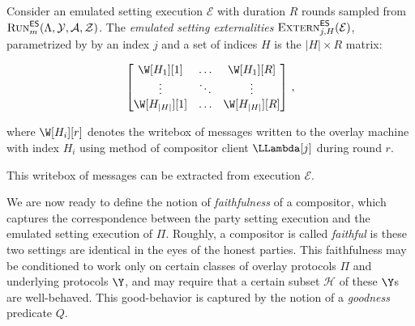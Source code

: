 \begin{definition}
  Consider an emulated setting execution $\mathcal{E}$ with duration $R$ rounds
  sampled from $\textsc{Run}^{\textsf{ES}}_m(\Lambda, \mathcal{Y}, \mathcal{A}, \mathcal{Z})$.
  The \emph{emulated setting externalities} $\textsc{Extern}^{\textsf{ES}}_{j,H}(\mathcal{E})$, parametrized by
  by an index $j$ and a set of indices $H$ is the $|H| \times R$ matrix:

  \[
  \begin{bmatrix}
    \W[H_1][1] &\ldots& \W[H_1][R]\\
         \vdots &\ddots& \vdots     \\
    \W[H_{|H|}][1] &\ldots& \W[H_{|H|}][R]
  \end{bmatrix}\,,
  \]

  where $\W[H_i][r]$ denotes the writebox of messages written to
  the overlay machine with index $H_i$
  using method \writeToMachine of compositor client $\LLambda[j]$
  during round $r$.

  This writebox of messages can be extracted from execution $\mathcal{E}$.
\end{definition}

\begin{definition}[Lateness]
\end{definition}


We are now ready to define the notion of \emph{faithfulness} of a
compositor, which captures the
correspondence between the party setting execution and the emulated setting
execution of $\Pi$. Roughly, a compositor is called \emph{faithful} is these
two settings are identical in the eyes of the honest parties.
This faithfulness may be conditioned to work only on certain classes
of overlay protocols $\Pi$ and underlying protocols $\Y$, and may
require that a certain subset $\mathcal{H}$ of these $\Y$s are well-behaved.
This good-behavior is captured by the notion of a \emph{goodness} predicate $Q$.

